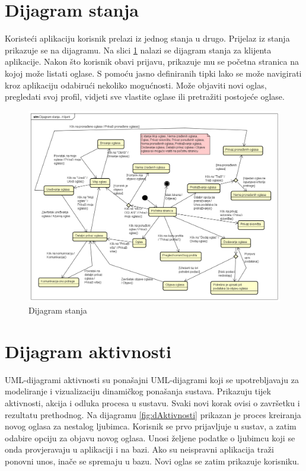 			\eject
		
		\section{Dijagram stanja}
			
			
			Koristeći aplikaciju korisnik prelazi iz jednog stanja u drugo. Prijelaz iz stanja prikazuje se na dijagramu. Na slici \ref{fig:dStanja} nalazi se dijagram stanja za klijenta aplikacije. Nakon što korisnik obavi prijavu, prikazuje mu se početna stranica na kojoj može listati oglase. S pomoću jasno definiranih tipki lako se može navigirati kroz aplikaciju odabirući nekoliko mogućnosti. Može objaviti novi oglas, pregledati svoj profil, vidjeti sve vlastite oglase ili pretražiti postojeće oglase.
			
			\begin{figure}[H]
				\includegraphics[scale=0.4]{dijagrami/dijagramStanja/dijagramStanja.PNG} %
				\centering
				\caption{Dijagram stanja}
				\label{fig:dStanja}
			\end{figure}
			
			\eject 
		
		\section{Dijagram aktivnosti}

			UML-dijagrami aktivnosti su ponašajni UML-dijagrami koji se upotrebljavaju za modeliranje i vizualizaciju dinamičkog ponašanja sustava. Prikazuju tijek aktivnosti, akcija i odluka procesa u sustavu. Svaki novi korak ovisi o završetku i rezultatu prethodnog. Na dijagramu \ref{fig:dAktivnosti} prikazan je proces kreiranja novog oglasa za nestalog ljubimca. Korisnik se prvo prijavljuje u sustav, a zatim odabire opciju za objavu novog oglasa. Unosi željene podatke o ljubimcu koji se onda provjeravaju u aplikaciji i na bazi. Ako su neispravni aplikacija traži ponovni unos, inače se spremaju u bazu. Novi oglas se zatim prikazuje korisniku.
			
